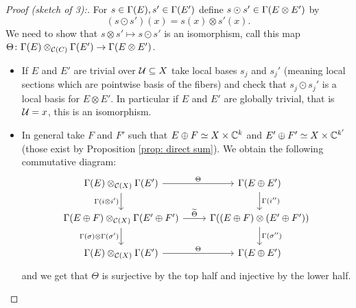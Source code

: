 \begin{proof}[Proof (sketch of 3):]
 For $s\in\Gamma(E),s'\in\Gamma(E')$ define $s\odot s'\in\Gamma(E\otimes E')$ by $$(s\odot s')(x)=s(x)\otimes s'(x).$$ We need to show that $s\otimes s'\mapsto s\odot s'$ is an isomorphism, call this map $\Theta\colon \Gamma(E)\otimes_{\mathcal{C}(C)}\Gamma(E')\to\Gamma(E\otimes E')$.
 
 \begin{itemize}
  \item If $E$ and $E'$ are trivial over $\mathcal{U}\subseteq X$ take local bases $s_j$ and $s_j'$ (meaning local sections which are pointwise basis of the fibers) and check that $s_j\odot s_j'$ is a local basis for $E\otimes E'$. In particular if $E$ and $E'$ are globally trivial, that is $\mathcal{U}=x$, this is an isomorphism.
  \item In general take $F$ and $F'$ such that $E\oplus F\simeq X\times\mathbb{C}^k$ and $E'\oplus F'\simeq X\times \mathbb{C}^{k'}$ (those exist by Proposition \eqref{prop: direct sum}). We obtain the following commutative diagram:
  $$\begin{tikzcd}
    \G(E)\otimes_{\Co(X)}\G(E') \arrow["\Theta",r] \arrow["\G(i\otimes i')"',d] & \G(E\oplus E') \arrow["\G(i'')",d] \\
    \G(E\oplus F)\otimes_{\Co(X)}\G(E'\oplus F') \arrow["\widetilde{\Theta}",r] \arrow["\G(\sigma)\otimes\G(\sigma')"',d] & \G((E\oplus F)\otimes(E'\oplus F'))\arrow["\G(\sigma'')",d] \\
    \G(E)\otimes_{\Co(X)}\G(E') \arrow["\Theta",r]  & \G(E\oplus E')
    \end{tikzcd}
 $$
 and we get that $\Theta$ is surjective by the top half and injective by the lower half.
 \end{itemize}
\end{proof}

